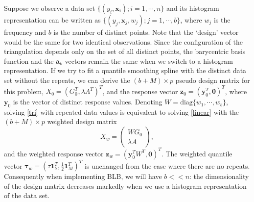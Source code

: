 \documentclass{statsoc}
\begin{document}
Suppose we observe a data set $\{(y_i,\boldsymbol{x_i});i=1,\cdots,n\}$ and its histogram representation can be written as $\{(y_j,\boldsymbol{x}_j,w_j);j=1,\cdots,b\}$, where $w_j$ is the frequency and $b$ is the number of distinct points. Note that the `design' vector would be the same for two identical observations. Since the configuration of the triangulation depends only on the set of all distinct points, the barycentric basis function and the $\boldsymbol{a}_k$ vectors remain the same when we switch to a histogram representation. If we try to fit a quantile smoothing spline with the distinct data set without the repeats, we can derive the $(b+M)\times p$ pseudo design matrix for this problem, $X_0=(G_0^T,\lambda A^T)^T$, and the response vector $\boldsymbol{z}_0=(\boldsymbol{y}_0^T,\boldsymbol{0})^T$, where $\boldsymbol{y}_0$ is the vector of distinct response values. Denoting $W=\text{diag}\{w_1,\cdots,w_b\}$, solving \eqref{tri}  {with repeated data values} is equivalent to solving \eqref{linear} with the $(b+M)\times p$ weighted design matrix
\begin{equation}
    \label{newdesign}
    X_w=\begin{pmatrix}
WG_0\\ 
\lambda A
\end{pmatrix},
\end{equation}
and the weighted response vector $\boldsymbol{z}_w=(\boldsymbol{y}_0^TW^T,\boldsymbol{0})^T$. The weighted quantile vector $\boldsymbol{\tau}_w=(\tau \boldsymbol{1}_b^T,\frac{1}{2}\boldsymbol{1}_M^T)^T$ is unchanged from the case where there are no repeats. Consequently when implementing BLB, we will have $b<<n$: the dimensionality of the design matrix decreases markedly  when we use a histogram representation of the data set.
\end{document}
